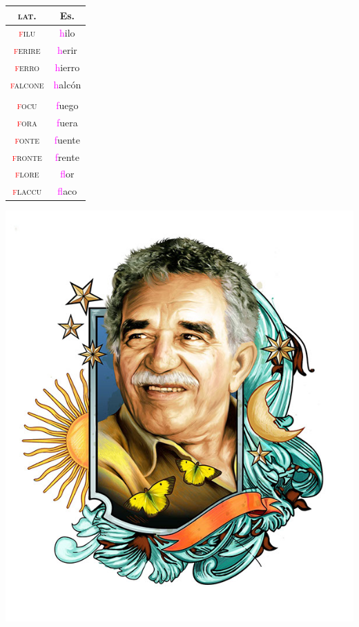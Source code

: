 \documentclass{report}[12pt]
\begin{document}
\begin{tcolorbox}[title=Debuccalization of /f/]
  
\end{tcolorbox}

\begin{tabular}{c c}
  \textsc{lat.} & Es. \\
  \hline
  \textsc{\textcolor{red}{f}ilu} & \textcolor{magenta}{h}ilo \\
  \textsc{\textcolor{red}{f}erire} & \textcolor{magenta}{h}erir \\
  \textsc{\textcolor{red}{f}erro} & \textcolor{magenta}{h}ierro \\
  \textsc{\textcolor{red}{f}alcone} & \textcolor{magenta}{h}alcón \\
                & \\
  \textsc{\textcolor{red}{f}ocu} & \textcolor{magenta}{f}uego \\
  \textsc{\textcolor{red}{f}ora} & \textcolor{magenta}{f}uera \\
  \textsc{\textcolor{red}{f}onte} & \textcolor{magenta}{f}uente \\
  \textsc{\textcolor{red}{f}ronte} & \textcolor{magenta}{f}rente \\
  \textsc{\textcolor{red}{f}lore} & \textcolor{magenta}{f}lor \\
  \textsc{\textcolor{red}{f}laccu} & \textcolor{magenta}{f}laco \\
\end{tabular}

\pagebreak

\includegraphics[scale=0.75]{marquez.jpg}
\end{document}
